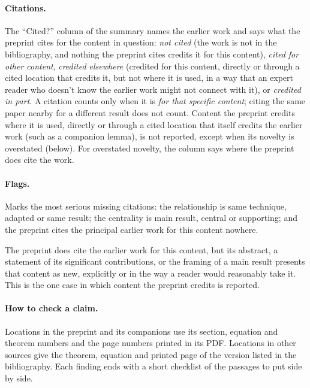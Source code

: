 \documentclass[11pt]{article}
\newcounter{finding}
\begin{document}
\paragraph{Citations.}
The ``Cited?'' column of the summary names the earlier work and says what the
preprint cites for the content in question: \emph{not cited} (the work is not
in the bibliography, and nothing the preprint cites credits it for this
content), \emph{cited for other content}, \emph{credited elsewhere} (credited
for this content, directly or through a cited location that credits it, but
not where it is used, in a way that an expert reader who doesn't know the earlier work might not connect with it), or \emph{credited in part}. A citation counts only when it is \emph{for that specific content};
citing the same paper nearby for a different result does not count. Content
the preprint credits where it is used, directly or through a cited location
that itself credits the earlier work (such as a companion
lemma), is not reported, except when its novelty is overstated (below). For
overstated novelty, the column says where the preprint does cite the work.

\paragraph{Flags.}
\begin{description}[leftmargin=1.5em,font=\normalfont\bfseries]
\item[Attribution gap.] Marks the most serious missing citations: the
relationship is same technique, adapted or same result; the centrality is main
result, central or supporting; and the preprint cites the principal earlier
work for this content nowhere.
\item[Overstated novelty.] The preprint does cite the earlier work for this
content, but its abstract, a statement of its significant contributions, or the framing of
a main result presents that content as new, explicitly or in the way a reader
would reasonably take it. This is the one case in which content the preprint
credits is reported.
\end{description}

\paragraph{How to check a claim.}
Locations in the preprint and its companions use its section,
equation and theorem numbers and the page numbers printed in its PDF.
Locations in other sources give the theorem, equation and printed page of the
version listed in the bibliography. Each finding ends with a short checklist
of the passages to put side by side.
\end{document}

